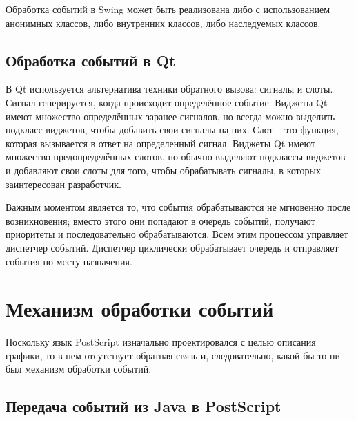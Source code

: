 \documentclass[14pt]{matmex-diploma}
\begin{document}
Обработка событий в Swing может быть реализована либо с использованием анонимных классов, либо внутренних классов, либо наследуемых классов.


\subsection{Обработка событий в Qt}

В Qt используется альтернатива техники обратного вызова: сигналы и слоты. Сигнал генерируется, когда происходит определённое событие. Виджеты Qt имеют множество определённых заранее сигналов, но всегда можно выделить подкласс виджетов, чтобы добавить свои сигналы на них. Слот -- это функция, которая вызывается в ответ на определенный сигнал. Виджеты Qt имеют множество предопределённых слотов, но обычно выделяют подклассы виджетов и добавляют свои слоты для того, чтобы обрабатывать сигналы, в которых заинтересован разработчик.

Важным моментом является то, что события обрабатываются не мгновенно после возникновения; вместо этого они попадают в очередь событий, получают приоритеты и последовательно обрабатываются. Всем этим процессом управляет диспетчер событий. Диспетчер циклически обрабатывает очередь и отправляет события по месту назначения.%




 






\section{Механизм обработки событий}

Поскольку язык PostScript изначально проектировался с целью описания графики, то в нем отсутствует обратная связь и, следовательно, какой бы то ни был механизм обработки событий.

\subsection{Передача событий из Java в PostScript}
\end{document}
